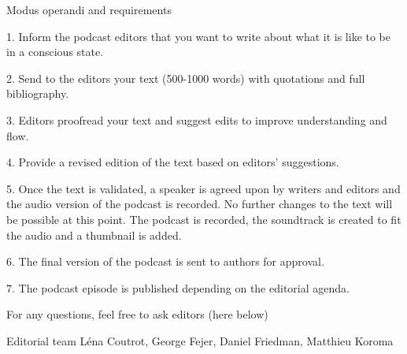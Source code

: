 \documentclass[11pt]{article}
\begin{document}
Modus operandi and requirements\par

1. Inform the podcast editors that you want to write about what it is like to be in a conscious state.\par

2. Send to the editors your text (500-1000 words) with quotations and full bibliography.\par

3. Editors proofread your text and suggest edits to improve understanding and flow.\par

4. Provide a revised edition of the text based on editors’ suggestions.\par

5. Once the text is validated, a speaker is agreed upon by writers and editors and the audio version of the podcast is recorded. No further changes to the text will be possible at this point. The podcast is recorded, the soundtrack is created to fit the audio and a thumbnail is added.\par

6. The final version of the podcast is sent to authors for approval.\par

7. The podcast episode is published depending on the editorial agenda.

For any questions, feel free to ask editors (here below)\par

Editorial team
Léna Coutrot, George Fejer, Daniel Friedman, Matthieu Koroma\par
\end{document}
